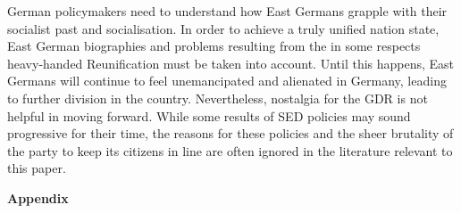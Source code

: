 \documentclass[a4paper, oneside, hyperfootnotes = false]{article}
\begin{document}
{German policymakers need to understand how East Germans grapple with their socialist past and socialisation.
In order to achieve a truly unified nation state, East German biographies and problems resulting from the in some respects heavy-handed Reunification must be taken into account.
Until this happens, East Germans will continue to feel unemancipated and alienated in Germany, leading to further division in the country.
Nevertheless, nostalgia for the GDR is not helpful in moving forward.
While some results of SED policies may sound progressive for their time, the reasons for these policies and the sheer brutality of the party to keep its citizens in line are often ignored in the literature relevant to this paper.

\vspace{4cm}

{}

\makeatletter %


\label{references}

\makeatother

\vspace{-.3cm}

\clearpage

{}
\mbox{} \vfill \centering \bfseries{{\Large Appendix}} \vfill \mbox{}
\label{appendix}

}%
\end{document}
